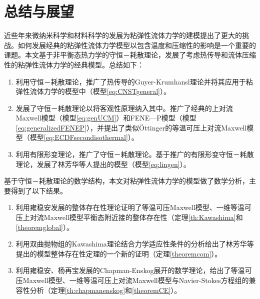 \chapter{总结与展望}

% 
近些年来微纳米科学和材料科学的发展为粘弹性流体力学的建模提出了更大的挑战。如何发展经典的粘弹性流体力学模型以包含温度和压缩性的影响是一个重要的课题。本文基于非平衡态热力学的守恒－耗散理论，发展了考虑热传导和流体压缩性的粘弹性流体力学的经典模型。总结如下：
\begin{enumerate}
	\item 利用守恒－耗散理论，推广了热传导的Guyer-Krumhansl理论并将其应用于粘弹性流体力学的模型中（模型\eqref{eq:CNSTgeneral}）。
	\item 发展了守恒－耗散理论以将客观性原理纳入其中。推广了经典的上对流Maxwell模型（模型\eqref{eq:genUCM}）和FENE—P模型（模型\eqref{eq:generalizedFENEP}），并提出了类似\"Ottinger的等温可压上对流Maxwell模型（模型\eqref{eq:ECDFsecondisothermal}）。
	\item 利用有限形变理论，推广了守恒－耗散理论。基于推广的有限形变守恒－耗散理论，发展了林芳华等人提出的模型（模型\eqref{eq:lingen}）。
\end{enumerate}

基于守恒－耗散理论的数学结构，本文对粘弹性流体力学的模型做了数学分析，主要得到了以下结果。
\begin{enumerate}
	\item 利用雍稳安发展的整体存在性理论证明了等温可压Maxwell模型、一维等温可压上对流Maxwell模型平衡态附近接的整体存在性（定理\ref{th:Kawashima}和\ref{theoremglobal}）。
	\item 利用双曲抛物组的Kawashima理论结合力学适应性条件的分析给出了林芳华等提出的模型整体存在性定理的一个新的证明（定理\ref{theoremcom}）。
	\item 利用雍稳安、杨再宝发展的Chapman-Enskog展开的数学理论，给出了等温可压Maxwell模型、一维等温可压上对流Maxwell模型与Navier-Stokes方程组的兼容性分析（定理\ref{th:chapmanenskog}和\ref{theoremCE}）。
\end{enumerate}

